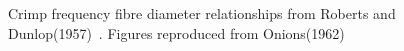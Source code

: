 %

\begin{figure}[]
\centering
  \caption{Crimp frequency fibre diameter relationships from Roberts and Dunlop(1957)~\cite{robe-1957}. Figures reproduced from Onions(1962)~\cite{onio-1962}}
\vfill
  \label{fig:crimpdiam}
\end{figure}

%

